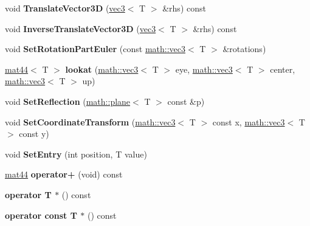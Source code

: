 \begin{DoxyCompactItemize}
\item 
\hypertarget{classmath_1_1mat44_a9321b1478f4c1de099e9dfc604e41b71}{
void {\bfseries TranslateVector3D} (\hyperlink{classmath_1_1vec3}{vec3}$<$ T $>$ \&rhs) const }
\label{classmath_1_1mat44_a9321b1478f4c1de099e9dfc604e41b71}

\item 
\hypertarget{classmath_1_1mat44_a3817d0738f95e0fbeb4a2ac4f2c06f06}{
void {\bfseries InverseTranslateVector3D} (\hyperlink{classmath_1_1vec3}{vec3}$<$ T $>$ \&rhs) const }
\label{classmath_1_1mat44_a3817d0738f95e0fbeb4a2ac4f2c06f06}

\item 
\hypertarget{classmath_1_1mat44_ae3d93b898c20f49db047fc30a3906f1c}{
void {\bfseries SetRotationPartEuler} (const \hyperlink{classmath_1_1vec3}{math::vec3}$<$ T $>$ \&rotations)}
\label{classmath_1_1mat44_ae3d93b898c20f49db047fc30a3906f1c}

\item 
\hypertarget{classmath_1_1mat44_aa3298c349d51a34e310600bab30566f3}{
\hyperlink{classmath_1_1mat44}{mat44}$<$ T $>$ {\bfseries lookat} (\hyperlink{classmath_1_1vec3}{math::vec3}$<$ T $>$ eye, \hyperlink{classmath_1_1vec3}{math::vec3}$<$ T $>$ center, \hyperlink{classmath_1_1vec3}{math::vec3}$<$ T $>$ up)}
\label{classmath_1_1mat44_aa3298c349d51a34e310600bab30566f3}

\item 
\hypertarget{classmath_1_1mat44_a7be4cb55b2bfb126ee6e75a56fdcf0d9}{
void {\bfseries SetReflection} (\hyperlink{classmath_1_1plane}{math::plane}$<$ T $>$ const \&p)}
\label{classmath_1_1mat44_a7be4cb55b2bfb126ee6e75a56fdcf0d9}

\item 
\hypertarget{classmath_1_1mat44_a9da35ea22f94f53ebc721397652e9fe3}{
void {\bfseries SetCoordinateTransform} (\hyperlink{classmath_1_1vec3}{math::vec3}$<$ T $>$ const x, \hyperlink{classmath_1_1vec3}{math::vec3}$<$ T $>$ const y)}
\label{classmath_1_1mat44_a9da35ea22f94f53ebc721397652e9fe3}

\item 
\hypertarget{classmath_1_1mat44_a2ccdbfc7e205429f50c98babcb1187d8}{
void {\bfseries SetEntry} (int position, T value)}
\label{classmath_1_1mat44_a2ccdbfc7e205429f50c98babcb1187d8}

\item 
\hypertarget{classmath_1_1mat44_afaa3ec8ef1b6425899cd054530152b6f}{
\hyperlink{classmath_1_1mat44}{mat44} {\bfseries operator+} (void) const }
\label{classmath_1_1mat44_afaa3ec8ef1b6425899cd054530152b6f}

\item 
\hypertarget{classmath_1_1mat44_a20dcec664e454262299ac5b873002b76}{
{\bfseries operator T $\ast$} () const }
\label{classmath_1_1mat44_a20dcec664e454262299ac5b873002b76}

\item 
\hypertarget{classmath_1_1mat44_a0595a19c2b67bc5e81037ea7490d5d51}{
{\bfseries operator const T $\ast$} () const }
\label{classmath_1_1mat44_a0595a19c2b67bc5e81037ea7490d5d51}

\end{DoxyCompactItemize}
